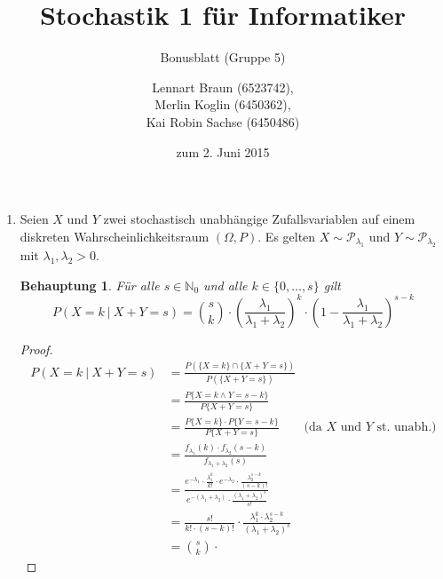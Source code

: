 \documentclass[a4paper]{scrartcl}
\title{Stochastik 1 für Informatiker}
\subtitle{Bonusblatt (Gruppe 5)}
\author{
    Lennart Braun (6523742), \\
    Merlin Koglin (6450362), \\
    Kai Robin Sachse (6450486)
}
\date{zum 2. Juni 2015}
\newtheorem*{behaupt}{Behauptung}
\begin{document}
\maketitle

\begin{enumerate}[label=\bfseries\arabic*.]
    \item
        Seien $X$ und $Y$ zwei stochastisch unabhängige Zufallsvariablen auf
        einem diskreten Wahrscheinlichkeitsraum $(\Omega, P)$.
        Es gelten $X \sim \mathcal{P}_{\lambda_1}$ und
        $Y \sim \mathcal{P}_{\lambda_2}$ mit $\lambda_1, \lambda_2 > 0$.
        \begin{behaupt}
            Für alle $s \in \mathbb{N}_0$ und alle $k \in \{0, \ldots, s\}$ gilt
            \begin{equation*}
                P(X = k \ |\ X + Y = s) = \binom{s}{k} \cdot
                \left( \frac{\lambda_1}{\lambda_1 + \lambda_2} \right)^k \cdot
                \left( 1 - \frac{\lambda_1}{\lambda_1 + \lambda_2} \right)^{s-k}
            \end{equation*}
        \end{behaupt}
        \begin{proof}
            \begin{equation*}
                \begin{split}
                    P(X = k \ |\ X + Y = s)
                    &= \frac{P(\{X = k\} \cap \{X + Y = s\})}{P(\{X + Y = s\})}
                    \\
                    &= \frac{P\{X = k \land Y = s - k\}}{P\{X + Y = s\}} \\
                    &= \frac{P\{X = k\} \cdot P\{Y = s - k\}}{P\{X + Y = s\}}
                    \qquad \text{(da $X$ und $Y$ st. unabh.)} \\
                    &= \frac{f_{\lambda_1}(k) \cdot f_{\lambda_2}(s - k)}
                            {f_{\lambda_1 + \lambda_2}(s)} \\
                    &= \frac{e^{-\lambda_1} \cdot \frac{\lambda_1^k}{k!} \cdot
                        e^{-\lambda_2} \cdot \frac{\lambda_2^{s-k}}{(s-k)!}}
                        {e^{-(\lambda_1 + \lambda_2)} \cdot
                        \frac{(\lambda_1 + \lambda_2)^{s}}{s!}} \\
                    &= \frac{s!}{k! \cdot (s-k)!} \cdot
                        \frac{\lambda_1^k \cdot \lambda_2^{s-k}}
                        {(\lambda_1 + \lambda_2)^s} \\
                    &= \binom{s}{k} \cdot

\end{split}
\end{equation*}
\end{proof}
\end{enumerate}
\end{document}
